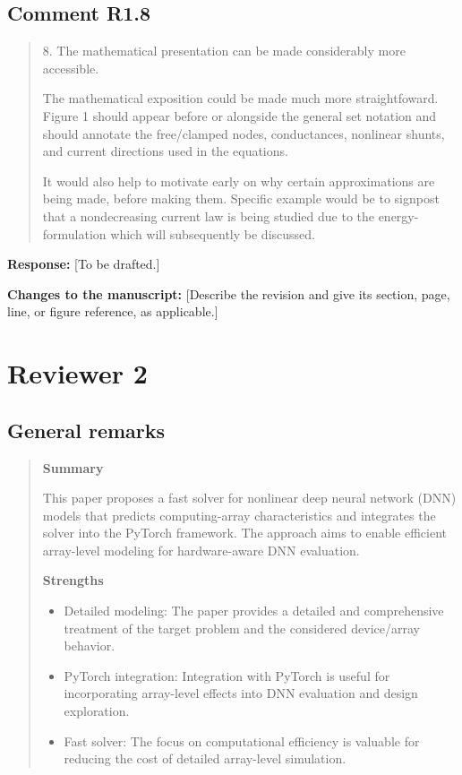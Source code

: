 \documentclass[11pt,a4paper]{article}
\newenvironment{reviewercomment}
  {\begin{quote}\small\color{reviewerblue}}
  {\end{quote}}
\newcommand{\placeholder}[1]{[#1]}
\begin{document}
\subsection*{Comment R1.8}
\begin{reviewercomment}
8. The mathematical presentation can be made considerably more accessible.

The mathematical exposition could be made much more straightfoward.
Figure 1 should appear before or alongside the general set notation and
should annotate the free/clamped nodes, conductances, nonlinear shunts,
and current directions used in the equations.

It would also help to motivate early on why certain approximations are
being made, before making them. Specific example would be to signpost
that a nondecreasing current law is being studied due to the
energy-formulation which will subsequently be discussed.
\end{reviewercomment}

\noindent\textbf{Response:}
\placeholder{To be drafted.}

\noindent\textbf{Changes to the manuscript:}
\placeholder{Describe the revision and give its section, page, line, or figure reference, as applicable.}

\clearpage
\section*{Reviewer 2}
\subsection*{General remarks}
\begin{reviewercomment}
\textbf{Summary}

This paper proposes a fast solver for nonlinear deep neural network (DNN)
models that predicts computing-array characteristics and integrates the
solver into the PyTorch framework. The approach aims to enable efficient
array-level modeling for hardware-aware DNN evaluation.

\textbf{Strengths}

\begin{itemize}

\item Detailed modeling: The paper provides a detailed and comprehensive
treatment of the target problem and the considered device/array behavior.

\item PyTorch integration: Integration with PyTorch is useful for
incorporating array-level effects into DNN evaluation and design
exploration.

\item Fast solver: The focus on computational efficiency is valuable for
reducing the cost of detailed array-level simulation.

\end{itemize}
\end{reviewercomment}
\end{document}

